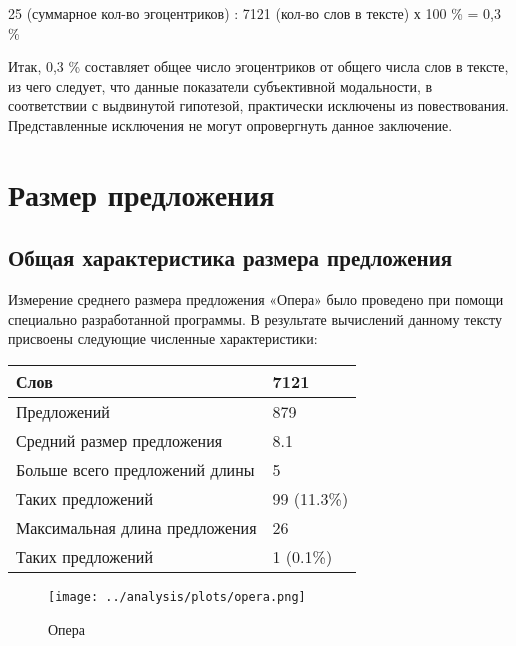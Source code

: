 \documentclass{kursa4}
\begin{document}
{      {25 (суммарное кол-во эгоцентриков) : 7121 (кол-во слов в тексте) х 100 \% = 0,3 \%}

      Итак, 0,3 \% составляет общее число эгоцентриков от общего числа слов в тексте, из чего следует, что данные показатели субъективной модальности, в соответствии с выдвинутой гипотезой, практически исключены из повествования. Представленные исключения не могут опровергнуть данное заключение.

    \section{Размер предложения}

      \subsection{Общая характеристика размера предложения}

        {Измерение среднего размера предложения «Опера»
        было проведено при помощи специально разработанной программы. В
        результате вычислений данному тексту присвоены следующие численные
        характеристики:}

        \begin{center}     
        \tablehead{} %
        \begin{tabular}{|m{5.767cm}|m{1.8599999cm}|}
          \hline
          Слов &
          7121\\\hline
          Предложений &
          879\\\hline
          Средний размер предложения &
          8.1\\\hline
          Больше всего предложений длины &
          5\\\hline
          Таких предложений &
          99 (11.3\%)\\\hline
          Максимальная длина предложения &
          26\\\hline
          Таких предложений &
          1 (0.1\%)\\\hline
        \end{tabular}
        \end{center} 
        
        \begin{figure}[htbp]
          \centering
          \texttt{[image: ../analysis/plots/opera.png]}
          \caption{Опера}
        \end{figure}
        

}
\end{document}

